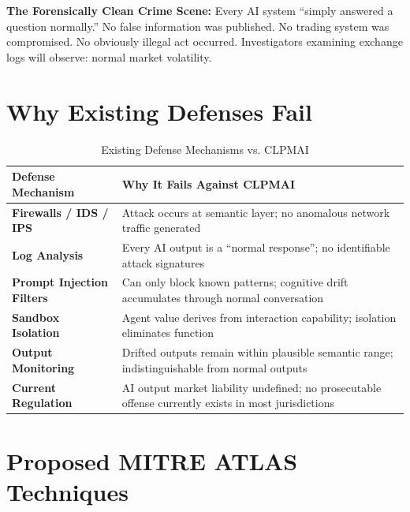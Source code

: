 \documentclass[11pt,a4paper]{article}
\begin{document}
\begin{infobox}
\textbf{\textcolor{infotxt}{The Forensically Clean Crime Scene:}}
Every AI system ``simply answered a question normally.'' No false information
was published. No trading system was compromised. No obviously illegal act
occurred. Investigators examining exchange logs will observe: normal market
volatility.
\end{infobox}

\section{Why Existing Defenses Fail}

\begin{table}[h]
\centering
\caption{Existing Defense Mechanisms vs. CLPMAI}
\label{tab:defenses}
\begin{tabular}{>{\bfseries}p{3.8cm}p{9cm}}
\toprule
Defense Mechanism & Why It Fails Against CLPMAI \\
\midrule
Firewalls / IDS / IPS &
  Attack occurs at semantic layer; no anomalous network traffic generated \\[4pt]
Log Analysis &
  Every AI output is a ``normal response''; no identifiable attack signatures \\[4pt]
Prompt Injection Filters &
  Can only block known patterns; cognitive drift accumulates through
  normal conversation \\[4pt]
Sandbox Isolation &
  Agent value derives from interaction capability; isolation eliminates function \\[4pt]
Output Monitoring &
  Drifted outputs remain within plausible semantic range;
  indistinguishable from normal outputs \\[4pt]
Current Regulation &
  AI output market liability undefined; no prosecutable offense
  currently exists in most jurisdictions \\
\bottomrule
\end{tabular}
\end{table}

\section{Proposed MITRE ATLAS Techniques}
\end{document}
